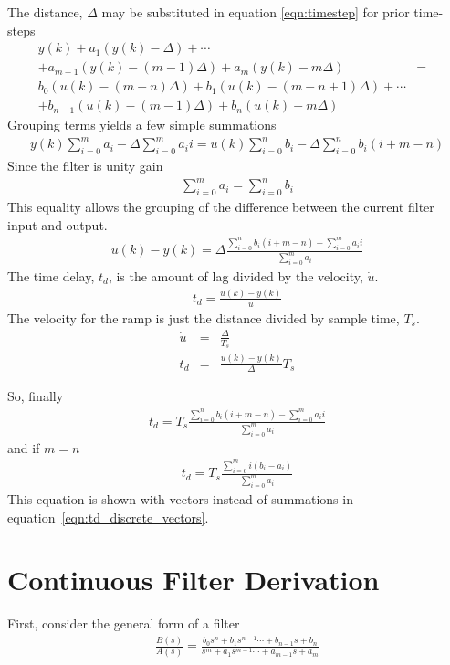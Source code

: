 \documentclass[10pt,letterpaper]{article}
\begin{document}
The distance, $\Delta$ may be substituted in equation \ref{eqn:timestep} for prior time-steps
\begin{eqnarray}
y(k) + a_1\left(y(k) - \Delta\right) + \cdots && \nonumber\\ 
+ a_{m-1}\left(y(k) - (m-1)\Delta\right) +
a_m\left(y(k) - m\Delta\right) &=& \nonumber\\
b_0\left(u(k) - (m-n)\Delta\right) + 
b_1\left(u(k) - (m-n+1)\Delta\right) + \cdots && \nonumber\\
+ b_{n-1}\left(u(k) - (m-1)\Delta\right) + 
b_n\left(u(k) - m\Delta\right) &&
\end{eqnarray}
Grouping terms yields a few simple summations
\begin{eqnarray}
y(k)\sum_{i=0}^m a_i - \Delta\sum_{i=0}^m a_ii = u(k)\sum_{i=0}^n b_i - \Delta\sum_{i=0}^n b_i(i+m-n)
\end{eqnarray}
Since the filter is unity gain
\begin{eqnarray}
\sum_{i=0}^m a_i =  \sum_{i=0}^n b_i
\end{eqnarray}
This equality allows the grouping of the difference between the current filter input and output.
\begin{eqnarray}
u(k) - y(k) = \Delta\frac{\sum\limits_{i=0}^n b_i(i+m-n) - \sum\limits_{i=0}^m a_ii}{\sum\limits_{i=0}^m a_i}
\end{eqnarray}
The time delay, $t_d$, is the amount of lag divided by the velocity, $\dot{u}$.
\begin{eqnarray}
t_d = \frac{u(k) - y(k)}{\dot{u}}
\end{eqnarray}
The velocity for the ramp is just the distance divided by sample time, $T_s$.
\begin{eqnarray}
\dot{u} &=& \frac{\Delta}{T_s}\\
t_d &=& \frac{u(k) - y(k)}{\Delta}T_s
\end{eqnarray}

So, finally
\begin{eqnarray}
t_d = T_s\frac{\sum\limits_{i=0}^n b_i(i+m-n) - \sum\limits_{i=0}^m a_ii}{\sum\limits_{i=0}^m a_i}
\end{eqnarray}
and if $m=n$
\begin{eqnarray}
t_d = T_s\frac{\sum\limits_{i=0}^m i(b_i - a_i)}{\sum\limits_{i=0}^m a_i}
\label{eqn:td_discrete_summations}
\end{eqnarray}
This equation is shown with vectors instead of summations in equation~\ref{eqn:td_discrete_vectors}.

\section*{Continuous Filter Derivation}
First, consider the general form of a filter
\begin{eqnarray}
\frac{B(s)}{A(s)}=\frac{b_0s^n + b_1s^{n-1}\cdots + b_{n-1}s + b_n}
                       {s^m + a_1s^{m-1}\cdots + a_{m-1}s + a_m}
\end{eqnarray}
\end{document}
